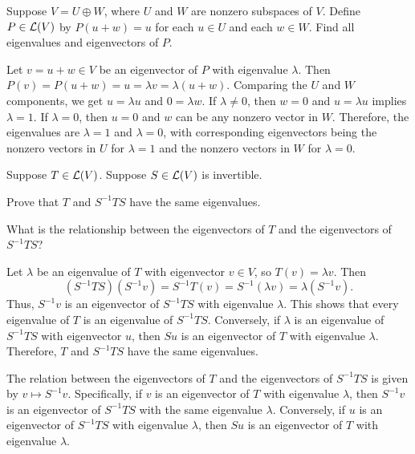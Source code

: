 \begin{exc}
\begin{exercise}
Suppose $V=U\oplus W$, where $U$ and $W$ are nonzero subspaces of $V$. Define
$P\in\mathcal{L}(V)$ by $P(u+w)=u$ for each $u\in U$ and each $w\in W$. Find all
eigenvalues and eigenvectors of $P$.
\end{exercise}
\begin{solution}
Let $v=u+w\in V$ be an eigenvector of $P$ with eigenvalue $\lambda$. Then
$P(v)=P(u+w)=u=\lambda v=\lambda(u+w)$. Comparing the $U$ and $W$ components,
we get $u=\lambda u$ and $0=\lambda w$. If $\lambda\ne0$, then $w=0$ and
$u=\lambda u$ implies $\lambda=1$. If $\lambda=0$, then $u=0$ and $w$ can be
any nonzero vector in $W$. Therefore, the eigenvalues are $\lambda=1$ and
$\lambda=0$, with corresponding eigenvectors being the nonzero vectors in $U$
for $\lambda=1$ and the nonzero vectors in $W$ for $\lambda=0$.
\end{solution}

\begin{exercise}
Suppose $T\in\mathcal{L}(V)$. Suppose $S\in\mathcal{L}(V)$ is invertible.
\begin{parts}
\item Prove that $T$ and $S^{-1}TS$ have the same eigenvalues.
\item What is the relationship between the eigenvectors of $T$ and the
  eigenvectors of $S^{-1}TS$?
\end{parts}
\end{exercise}
\begin{solution}
\begin{parts}
\item Let $\lambda$ be an eigenvalue of $T$ with eigenvector $v\in V$, so
  $T(v)=\lambda v$. Then
  \[ (S^{-1}TS)(S^{-1}v) = S^{-1}T(v) = S^{-1}(\lambda v)
     = \lambda(S^{-1}v). \]
  Thus, $S^{-1}v$ is an eigenvector of $S^{-1}TS$ with eigenvalue $\lambda$.
  This shows that every eigenvalue of $T$ is an eigenvalue of $S^{-1}TS$.
  Conversely, if $\lambda$ is an eigenvalue of $S^{-1}TS$ with eigenvector $u$,
  then $Su$ is an eigenvector of $T$ with eigenvalue $\lambda$. Therefore, $T$
  and $S^{-1}TS$ have the same eigenvalues.
\item The relation between the eigenvectors of $T$ and the eigenvectors of
  $S^{-1}TS$ is given by $v\mapsto S^{-1}v$. Specifically, if $v$ is an
  eigenvector of $T$ with eigenvalue $\lambda$, then $S^{-1}v$ is an
  eigenvector of $S^{-1}TS$ with the same eigenvalue $\lambda$. Conversely, if
  $u$ is an eigenvector of $S^{-1}TS$ with eigenvalue $\lambda$, then $Su$ is
  an eigenvector of $T$ with eigenvalue $\lambda$. \qedhere
\end{parts}
\end{solution}


\end{exc}
